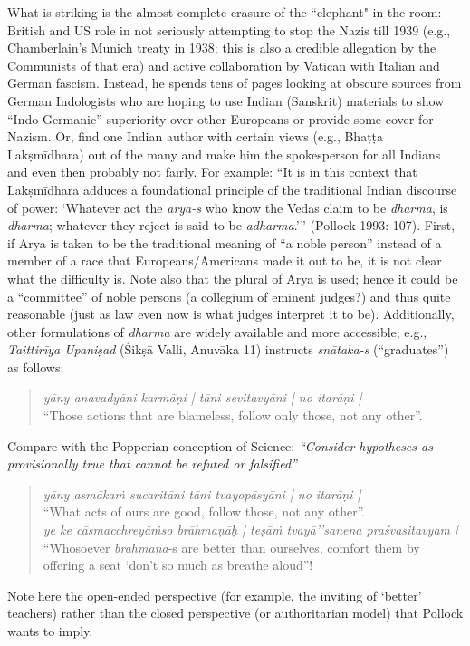 {\begin{enumerate}
What is striking is the almost complete erasure of the ``elephant" in the room: British and US role in not seriously attempting to stop the Nazis till 1939 (e.g., Chamberlain’s Munich treaty in 1938; this is also a credible allegation by the Communists of that era) and active collaboration by Vatican with Italian and German fascism. Instead, he spends tens of pages looking at obscure sources from German Indologists who are hoping to use Indian (Sanskrit) materials to show “Indo-Germanic” superiority over other Europeans or provide some cover for Nazism. Or, find one Indian author with certain views (e.g., Bhaṭṭa Lakṣmīdhara) out of the many and make him the spokesperson for all Indians and even then probably not fairly. For example: “It is in this context that Lakṣmīdhara adduces a foundational principle of the traditional Indian discourse of power: ‘Whatever act the {\sl arya-s} who know the Vedas claim to be {\sl dharma}, is {\sl dharma}; whatever they reject is said to be {\sl adharma}.’” (Pollock 1993: 107). First, if Arya is taken to be the traditional meaning of “a noble person” instead of a member of a race that Europeans/Americans made it out to be, it is not clear what the difficulty is. Note also that the plural of Arya is used; hence it could be a “committee” of noble persons (a collegium of eminent judges?) and thus quite reasonable (just as law even now is what judges interpret it to be). Additionally, other formulations of {\sl dharma} are widely available and more accessible; e.g., {\sl Taittirīya Upaniṣad} (Śikṣā Valli, Anuvāka 11) instructs {\sl snātaka-s} (“graduates”) as follows:
\begin{quote}
{\sl yāny anavadyāni karmāṇi | tāni sevitavyāni | no itarāṇi |}\\
{\rm “Those actions that are blameless, follow only those, not any other”.}
\end{quote}
Compare with the Popperian conception of Science: {\sl “Consider hypotheses as provisionally true that cannot be refuted or falsified”}
\begin{quote}
{\sl yāny asmākaṁ sucaritāni tāni tvayopāsyāni | no itarāṇi |}\\
“What acts of ours are good, follow those, not any other”.\\[2pt]
{\sl ye ke cāsmacchreyāṁso brāhmaṇāḥ | teṣāṁ tvayā’’sanena praśvasitavyam |}\\
“Whosoever \textsl{brāhmaṇa}-s are better than ourselves, comfort them by offering a seat `don't so much as breathe aloud”!
\end{quote}
Note here the open-ended perspective (for example, the inviting of `better' teachers) rather than the closed perspective (or authoritarian model) that Pollock wants to imply.
\end{enumerate}}

